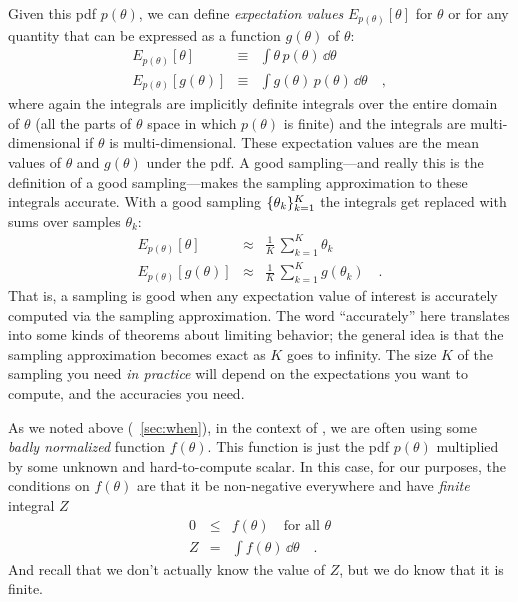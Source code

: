 \documentclass[modern]{aastex61}
\newcommand{\MCMC}{\acronym{MCMC}}
\newcommand{\pars}{\theta}
\begin{document}
Given this pdf $p(\pars)$, we can define \emph{expectation values}
$E_{p(\pars)}[\pars]$
for $\pars$ or for any quantity that can be expressed as a function $g(\pars)$
of $\pars$:
\begin{eqnarray}
E_{p(\pars)}[\pars] &\equiv& \int \pars\,p(\pars)\,\dd \pars
\\
E_{p(\pars)}[g(\pars)] &\equiv& \int g(\pars)\,p(\pars)\,\dd \pars
\quad ,
\end{eqnarray}
where again the integrals are implicitly definite integrals over the
entire domain
of $\pars$ (all the parts of $\pars$ space in which $p(\pars)$ is finite) and the
integrals are multi-dimensional if $\pars$ is multi-dimensional.
These expectation values are the mean values of $\pars$ and $g(\pars)$ under
the pdf.  A good sampling---and really this is the definition of a good
sampling---makes the sampling approximation to these integrals
accurate.
With a good sampling $\setof{\pars_k}_{k=1}^K$ the integrals get replaced
with sums over samples $\pars_k$:
\begin{eqnarray}
E_{p(\pars)}[\pars] &\approx& \frac{1}{K}\,\sum_{k=1}^K \pars_k
\\
E_{p(\pars)}[g(\pars)] &\approx& \frac{1}{K}\,\sum_{k=1}^K g(\pars_k)
\quad .
\end{eqnarray}
That is, a sampling is good when any expectation value of interest is
accurately computed via the sampling approximation.
The word ``accurately'' here translates into some kinds of theorems
about limiting behavior; the general idea is that the sampling
approximation becomes exact as $K$ goes to infinity.
The size $K$ of the sampling you need \emph{in practice} will depend
on the expectations you want to compute, and the accuracies you need.

As we noted above (\sectionname~\ref{sec:when}), in the context of \MCMC, we are often
using some \emph{badly normalized} function $f(\pars)$.
This function is just the pdf $p(\pars)$ multiplied by some unknown and
hard-to-compute scalar.
In this case, for our purposes, the conditions on $f(\pars)$ are that it
be non-negative everywhere and have \emph{finite} integral $Z$
\begin{eqnarray}
0 &\leq& f(\pars) \quad \mbox{for all $\pars$}
\\
Z &=& \int f(\pars)\,\dd \pars \label{eq:proper}
\quad .
\end{eqnarray}
And recall that we don't actually know the value of $Z$, but we do know
that it is finite.
\end{document}
